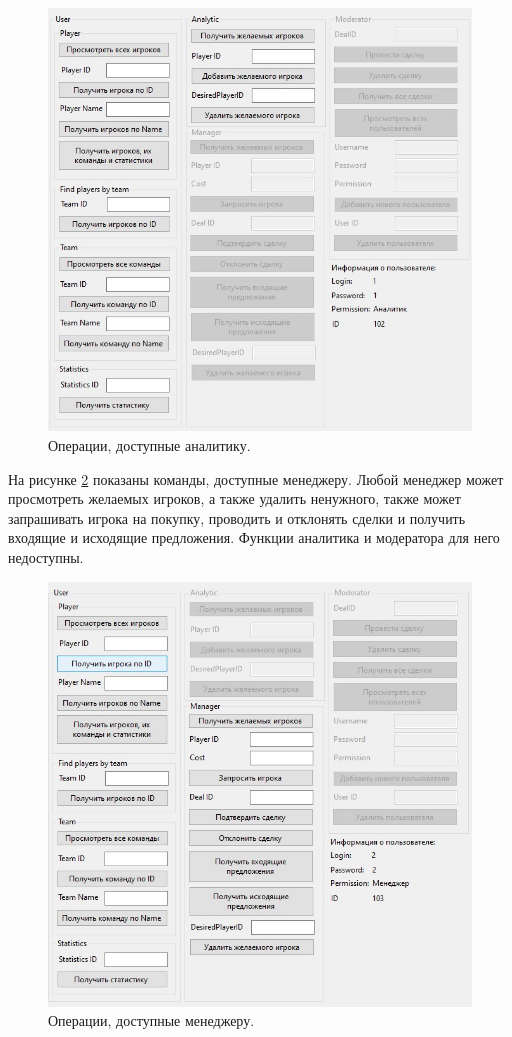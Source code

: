 \begin{figure}[h!]
	\centering
	\includegraphics[scale=0.90]{img/analytic.jpg}
	\caption{Операции, доступные аналитику.}
	\label{img:analytic}
\end{figure}
\clearpage
На рисунке \ref{img:manager} показаны команды, доступные менеджеру. Любой менеджер может просмотреть желаемых игроков, а также удалить ненужного, также может запрашивать игрока на покупку, проводить и отклонять сделки и получить входящие и исходящие предложения. Функции аналитика и модератора для него недоступны.
\begin{figure}[h!]
	\centering
	\includegraphics[scale=0.90]{img/manager.jpg}
	\caption{Операции, доступные менеджеру.}
	\label{img:manager}
\end{figure}
